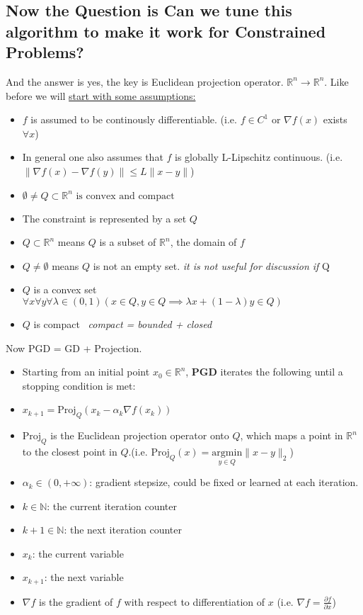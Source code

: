 \documentclass{article}
\begin{document}
\subsection*{Now the Question is Can we tune this algorithm to make it work for Constrained Problems?}
And the answer is yes, the key is Euclidean projection operator. $\mathbb{R}^n \to \mathbb{R}^n$. 
Like before we will \underline{start with some assumptions:}
\begin{itemize}
  \item $f$ is assumed to be continously differentiable. (i.e. $f \in C^1$ or $\nabla f(x)$ exists $\forall x$)
  \item In general one also assumes that $f$ is globally L-Lipschitz continuous. (i.e. $\| \nabla f(x) - \nabla f(y) \| \leq L \|x - y\|$)

\item \(\emptyset \neq Q \subset \mathbb{R}^n \text{ is convex and compact}
\)
    \item The constraint is represented by a set $Q$
    \item $Q \subset \mathbb{R}^n$ means $Q$ is a subset of $\mathbb{R}^n$, the domain of $f$
    \item $Q \neq \emptyset$ means $Q$ is not an empty set. \textit{it is not useful for discussion if } Q 
    \item $Q$ is a convex set \ \(
\forall x \forall y \forall \lambda \in (0,1) \left( x \in Q, y \in Q \implies \lambda x + (1 - \lambda) y \in Q \right)
\)
    \item $Q$ is compact \ \textit{compact = bounded + closed} \\
\end{itemize}
Now PGD = GD + Projection. \\
\begin{itemize}
    \item Starting from an initial point $x_0 \in \mathbb{R}^n$, \textbf{PGD} iterates the following until a stopping condition is met:
    \item $x_{k+1} = \text{Proj}_Q(x_k - \alpha_k \nabla f(x_k))$
    \item $\text{Proj}_Q$ is the Euclidean projection operator onto $Q$, which maps a point in $\mathbb{R}^n$ to the closest point in $Q$.(i.e. $\text{Proj}_Q(x) = \underset{y \in Q}{\text{argmin}} \|x - y\|_2$)
    \item $\alpha_k \in (0, +\infty)$: gradient stepsize, could be fixed or learned at each iteration.
    \item $k \in \mathbb{N}$: the current iteration counter
    \item $k + 1 \in \mathbb{N}$: the next iteration counter
    \item $x_k$: the current variable
    \item $x_{k+1}$: the next variable
    \item $\nabla f$ is the gradient of $f$ with respect to differentiation of $x$ (i.e. $\nabla f = \frac{\partial f}{\partial x}$)
\end{itemize}
\end{document}
